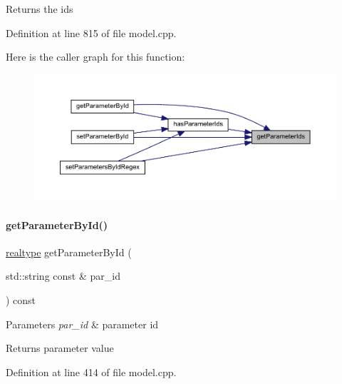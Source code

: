 \begin{DoxyReturn}{Returns}
the ids 
\end{DoxyReturn}


Definition at line 815 of file model.\+cpp.

Here is the caller graph for this function\+:
\nopagebreak
\begin{figure}[H]
\begin{center}
\leavevmode
\includegraphics[width=350pt]{classamici_1_1_model_a2c3cf99676168a01fccf6f4217f85297_icgraph}
\end{center}
\end{figure}
\mbox{\label{classamici_1_1_model_a4436bd89ae2cb032cbf13db478d99e15}} 
\paragraph{\texorpdfstring{getParameterById()}{getParameterById()}}
{\footnotesize\ttfamily \mbox{\hyperlink{namespaceamici_a1bdce28051d6a53868f7ccbf5f2c14a3}{realtype}} get\+Parameter\+By\+Id (\begin{DoxyParamCaption}\item[{std\+::string const \&}]{par\+\_\+id }\end{DoxyParamCaption}) const}


\begin{DoxyParams}{Parameters}
{\em par\+\_\+id} & parameter id \\
\hline
\end{DoxyParams}
\begin{DoxyReturn}{Returns}
parameter value 
\end{DoxyReturn}


Definition at line 414 of file model.\+cpp.

